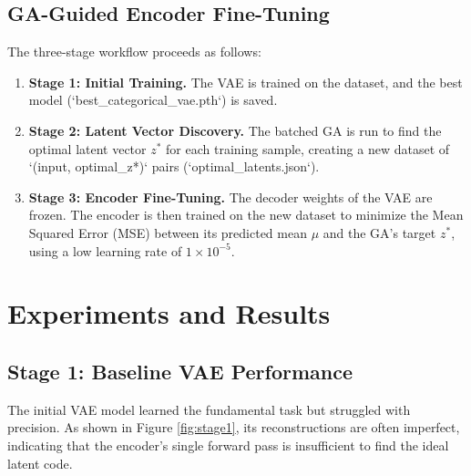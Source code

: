 \documentclass[11pt, a4paper, twocolumn]{article}
\begin{document}
\subsection{GA-Guided Encoder Fine-Tuning}
The three-stage workflow proceeds as follows:
\begin{enumerate}
    \item \textbf{Stage 1: Initial Training.} The VAE is trained on the dataset, and the best model (`best_categorical_vae.pth`) is saved.
    \item \textbf{Stage 2: Latent Vector Discovery.} The batched GA is run to find the optimal latent vector $z^*$ for each training sample, creating a new dataset of `(input, optimal_z*)` pairs (`optimal_latents.json`).
    \item \textbf{Stage 3: Encoder Fine-Tuning.} The decoder weights of the VAE are frozen. The encoder is then trained on the new dataset to minimize the Mean Squared Error (MSE) between its predicted mean $\mu$ and the GA's target $z^*$, using a low learning rate of $1 \times 10^{-5}$.
\end{enumerate}

\section{Experiments and Results}

\subsection{Stage 1: Baseline VAE Performance}
The initial VAE model learned the fundamental task but struggled with precision. As shown in Figure \ref{fig:stage1}, its reconstructions are often imperfect, indicating that the encoder's single forward pass is insufficient to find the ideal latent code.
\end{document}
